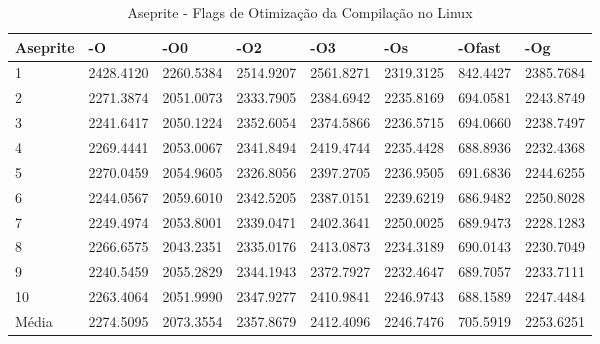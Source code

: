 \begin{table}[!ht]
\tiny
\centering
\caption{Aseprite - Flags de Otimização da Compilação no Linux}
\label{tab:otimizacao_compilacao:linux:aseprite}
\begin{tabular}{llllllll}
\textbf{Aseprite} & \textbf{-O}  & \textbf{-O0}   & \textbf{-O2} & \textbf{-O3} & \textbf{-Os} & \textbf{-Ofast} & \textbf{-Og} \\ \toprule
1                 & 2428.4120    & 2260.5384      & 2514.9207    & 2561.8271    & 2319.3125    &    842.4427     & 2385.7684  \\ 
2                 & 2271.3874    & 2051.0073      & 2333.7905    & 2384.6942    & 2235.8169    &    694.0581     & 2243.8749  \\ 
3                 & 2241.6417    & 2050.1224      & 2352.6054    & 2374.5866    & 2236.5715    &    694.0660     & 2238.7497  \\ 
4                 & 2269.4441    & 2053.0067      & 2341.8494    & 2419.4744    & 2235.4428    &    688.8936     & 2232.4368  \\ 
5                 & 2270.0459    & 2054.9605      & 2326.8056    & 2397.2705    & 2236.9505    &    691.6836     & 2244.6255  \\ 
6                 & 2244.0567    & 2059.6010      & 2342.5205    & 2387.0151    & 2239.6219    &    686.9482     & 2250.8028  \\ 
7                 & 2249.4974    & 2053.8001      & 2339.0471    & 2402.3641    & 2250.0025    &    689.9473     & 2228.1283  \\ 
8                 & 2266.6575    & 2043.2351      & 2335.0176    & 2413.0873    & 2234.3189    &    690.0143     & 2230.7049  \\ 
9                 & 2240.5459    & 2055.2829      & 2344.1943    & 2372.7927    & 2232.4647    &    689.7057     & 2233.7111  \\ 
10                & 2263.4064    & 2051.9990      & 2347.9277    & 2410.9841    & 2246.9743    &    688.1589     & 2247.4484  \\ \bottomrule
Média             & 2274.5095    & 2073.3554      & 2357.8679    & 2412.4096    & 2246.7476    &    705.5919     & 2253.6251  \\ 
\end{tabular}
\end{table}

